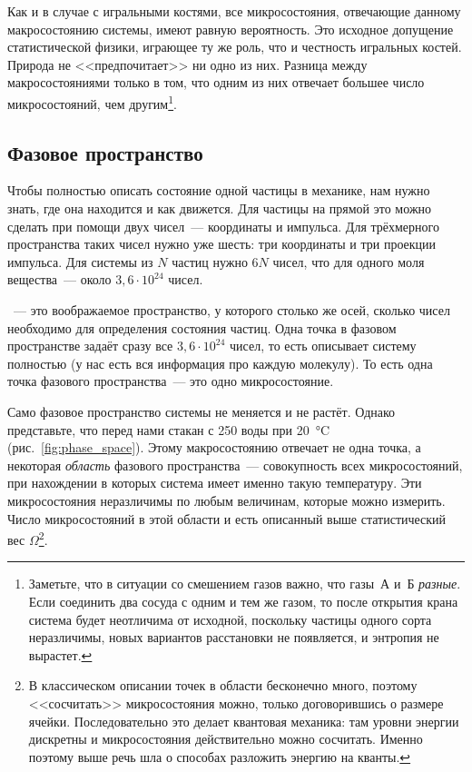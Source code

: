 Как и в случае с игральными костями, все микросостояния, отвечающие данному макросостоянию системы, имеют равную вероятность. Это исходное допущение статистической физики, играющее ту же роль, что и честность игральных костей. Природа не <<предпочитает>> ни одно из них. Разница между макросостояниями только в том, что одним из них отвечает большее число микросостояний, чем другим\footnote{Заметьте, что в ситуации со смешением газов важно, что газы~А и~Б \emph{разные}. Если соединить два сосуда с одним и тем же газом, то после открытия крана система будет неотличима от исходной, поскольку частицы одного сорта неразличимы, новых вариантов расстановки не появляется, и энтропия не вырастет.}.

\subsection*{Фазовое пространство}

Чтобы полностью описать состояние одной частицы в механике, нам нужно знать, где она находится и как движется. Для частицы на прямой это можно сделать при помощи двух чисел~--- координаты и импульса. Для трёхмерного пространства таких чисел нужно уже шесть: три координаты и три проекции импульса. Для системы из $N$ частиц нужно $6N$ чисел, что для одного моля вещества~--- около $3{,}6\cdot10^{24}$ чисел.

~--- это воображаемое пространство, у которого столько же осей, сколько чисел необходимо для определения состояния частиц. Одна точка в фазовом пространстве задаёт сразу все $3{,}6\cdot10^{24}$ чисел, то есть описывает систему полностью (у нас есть вся информация про каждую молекулу). То есть одна точка фазового пространства~--- это одно микросостояние.

Само фазовое пространство системы не меняется и не растёт. Однако представьте, что перед нами стакан с \qty{250}{\ruG} воды при \qty{20}{\degreeCelsius} (рис.~\ref{fig:phase_space}). Этому макросостоянию отвечает не одна точка, а некоторая \emph{область} фазового пространства~--- совокупность всех микросостояний, при нахождении в которых система имеет именно такую температуру. Эти микросостояния неразличимы по любым величинам, которые можно измерить. Число микросостояний в этой области и есть описанный выше статистический вес $\Omega$\footnote{В классическом описании точек в области бесконечно много, поэтому <<сосчитать>> микросостояния можно, только договорившись о размере ячейки. Последовательно это делает квантовая механика: там уровни энергии дискретны и микросостояния действительно можно сосчитать. Именно поэтому выше речь шла о способах разложить энергию на кванты.}.

